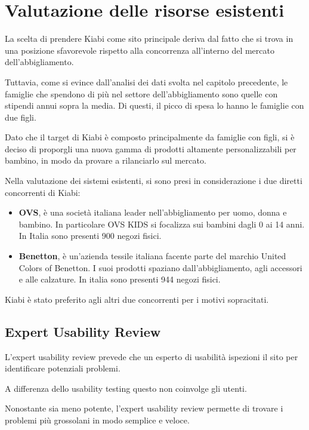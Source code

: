 \documentclass[12pt,italian,]{report}
\providecommand{\tightlist}{%
  \setlength{\itemsep}{0pt}\setlength{\parskip}{0pt}}
\begin{document}
\chapter{Valutazione delle risorse
esistenti}\label{valutazione-delle-risorse-esistenti}

La scelta di prendere Kiabi come sito principale deriva dal fatto che si trova in una posizione sfavorevole rispetto alla concorrenza all'interno del mercato dell'abbigliamento.

Tuttavia, come si evince dall'analisi dei dati svolta nel capitolo precedente, le famiglie che spendono di più nel settore dell'abbigliamento sono quelle con stipendi annui sopra la media. Di questi, il picco di spesa lo hanno le famiglie con due figli.

Dato che il target di Kiabi è composto principalmente da famiglie con figli, si è deciso di proporgli una nuova gamma di prodotti altamente personalizzabili per bambino, in modo da provare a rilanciarlo sul mercato. 

Nella valutazione dei sistemi esistenti, si sono presi in considerazione i due diretti concorrenti di Kiabi:

\begin{itemize}
\tightlist
\item \textbf{OVS}, è una società italiana leader nell'abbigliamento per uomo, donna e bambino. In particolare OVS KIDS si focalizza sui bambini dagli 0 ai 14 anni. In Italia sono presenti 900 negozi fisici.  
\item \textbf{Benetton}, è un'azienda tessile italiana facente parte del marchio United Colors of Benetton. I suoi prodotti spaziano dall'abbigliamento, agli accessori e alle calzature. In italia sono presenti 944 negozi fisici.
\end{itemize}

Kiabi è stato preferito agli altri due concorrenti per i motivi sopracitati.

\section{Expert Usability Review}\label{expert-usability-review}

L'expert usability review prevede che un esperto di usabilità ispezioni il sito per identificare potenziali problemi.

A differenza dello usability testing questo non coinvolge gli utenti.

Nonostante sia meno potente, l'expert usability review permette di trovare i problemi più grossolani in modo semplice e veloce.
\end{document}
